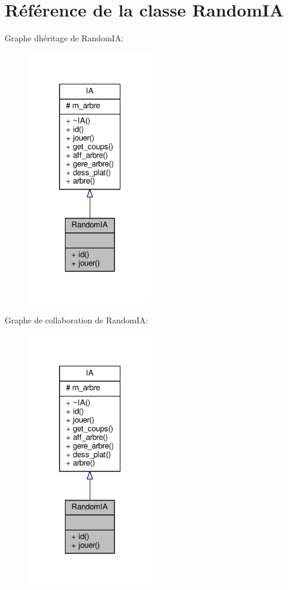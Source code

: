 \hypertarget{classRandomIA}{}\section{Référence de la classe Random\+IA}
\label{classRandomIA}


Graphe d\textquotesingle{}héritage de Random\+IA\+:\nopagebreak
\begin{figure}[H]
\begin{center}
\leavevmode
\includegraphics[width=157pt]{classRandomIA__inherit__graph}
\end{center}
\end{figure}


Graphe de collaboration de Random\+IA\+:\nopagebreak
\begin{figure}[H]
\begin{center}
\leavevmode
\includegraphics[width=157pt]{classRandomIA__coll__graph}
\end{center}
\end{figure}
